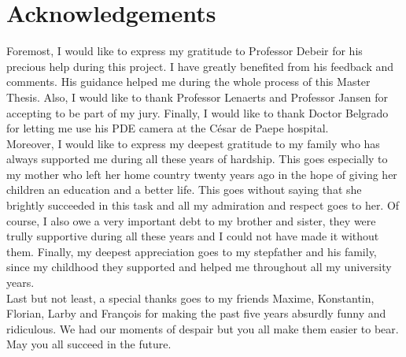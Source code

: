 \chapter*{Acknowledgements}
\thispagestyle{empty}


Foremost, I would like to express my gratitude to Professor Debeir for his precious help during this project. I have greatly benefited from his feedback and comments. His guidance helped me during the whole process of this Master Thesis. Also, I would like to thank Professor Lenaerts and Professor Jansen for accepting to be part of my jury. Finally, I would like to thank Doctor Belgrado for letting me use his PDE camera at the César de Paepe hospital.\\

Moreover, I would like to express my deepest gratitude to my family who has always supported me during all these years of hardship. This goes especially to my mother who left her home country twenty years ago in the hope of giving her children an education and a better life. This goes without saying that she brightly succeeded in this task and all my admiration and respect goes to her. Of course, I also owe a very important debt to my brother and sister, they were trully supportive during all these years and I could not have made it without them. Finally, my deepest appreciation goes to my stepfather and his family, since my childhood they supported and helped me throughout all my university years.\\

Last but not least, a special thanks goes to my friends Maxime, Konstantin, Florian, Larby and François for making the past five years absurdly funny and ridiculous. We had our moments of despair but you all make them easier to bear. May you all succeed in the future.

\clearpage